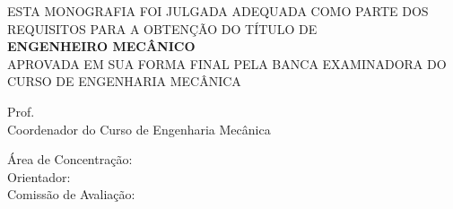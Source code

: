 \centering
\imprimirautor
\vspace*{5\baselineskip} %

\imprimirtitulo

\vspace*{3\baselineskip} %
\begin{mdframed}[leftmargin=1cm,rightmargin=0pt]
\centering
ESTA MONOGRAFIA FOI JULGADA ADEQUADA COMO PARTE DOS REQUISITOS PARA A OBTENÇÃO DO TÍTULO DE\\
\textbf{ENGENHEIRO MECÂNICO}\\
APROVADA EM SUA FORMA FINAL PELA BANCA EXAMINADORA DO
CURSO DE ENGENHARIA MECÂNICA
\vspace*{1\baselineskip} %

\raggedright
\parindent=0pt
\hspace{12em}Prof. \coordenador\\
\hspace{12em}Coordenador do Curso de Engenharia Mecânica
\end{mdframed}
\raggedright
\vspace*{1\baselineskip} %
Área de Concentração: \areaconcentracao\\
\vspace*{1\baselineskip} %
Orientador: \imprimirorientador\\
\vspace*{1\baselineskip} %
Comissão de Avaliação:\\
\vspace*{1\baselineskip} %
\expandafter\forcsvlist\expandafter\imprimecomissao\expandafter{\comissao}